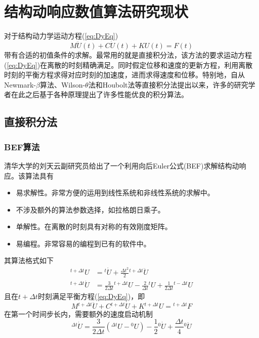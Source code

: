\chapter{结构动响应数值算法研究现状}

对于结构动力学运动方程(\ref{eq:DyEq})
\begin{equation}
	M\ddot{U}(t)+C\dot{U}(t)+KU(t)=F(t)\label{eq:DyEq}
\end{equation}
带有合适的初值条件的求解。最常用的就是直接积分法，该方法的要求运动方程(\ref{eq:DyEq})在离散的时刻精确满足。同时假定位移和速度的更新方程，利用离散时刻的平衡方程求得对应时刻的加速度，进而求得速度和位移。特别地，自从Newmark-$\beta$算法\cite{Newmark1959}、Wilson-$\theta$法\cite{Wilson1968}和Houbolt法\cite{Chopra2011}等直接积分法提出以来，许多的研究学者在此之后基于各种原理提出了许多性能优良的积分算法。

\section{直接积分法}
\subsection{BEF算法}
清华大学的刘天云副研究员给出了一个利用向后Euler公式(BEF)求解结构动响应\cite{Liu2012}。该算法具有
\begin{itemize}
\item[\ddag] 易求解性。非常方便的运用到线性系统和非线性系统的求解中。
\item[\ddag] 不涉及额外的算法参数选择，如拉格朗日乘子。
\item[\ddag] 单解性。在离散的时刻具有对称的有效刚度矩阵。
\item[\ddag] 易编程。非常容易的编程到已有的软件中。
\end{itemize}
其算法格式如下
\begin{align}
{^{t+\Delta t}\!U}&={^t\!\dot{U}}+\frac{\Delta t^2}{2}{^{t+\Delta t}\!\ddot{U}}\\
{^{t+\Delta t}\!\dot{U}}&=\frac{3}{2\Delta t}{^{t+\Delta t}\!U}-\frac{2}{\Delta t}{^t\!U}+\frac{1}{2\Delta t}{^{t-\Delta t}\!U}
\end{align}
且在$t+\Delta t$时刻满足平衡方程(\ref{eq:DyEq})，即
\begin{equation}
	M{^{t+\Delta t}\!\ddot{U}}+C{^{t+\Delta t}\!\dot{U}}+K{^{t+\Delta t}\!U}={^{t+\Delta t}\!F}\label{eq:batheDyEq1}
\end{equation}
在第一个时间步长内，需要额外的速度启动机制
\begin{equation}
{^{\Delta t}\!\dot{U}}=\frac{3}{2\Delta t}({^{\Delta t}\!U}-{^0\!U})-\frac{1}{2}{^0\!\dot{U}}+\frac{\Delta t}{4}{^{0}\!\ddot{U}}
\end{equation}
